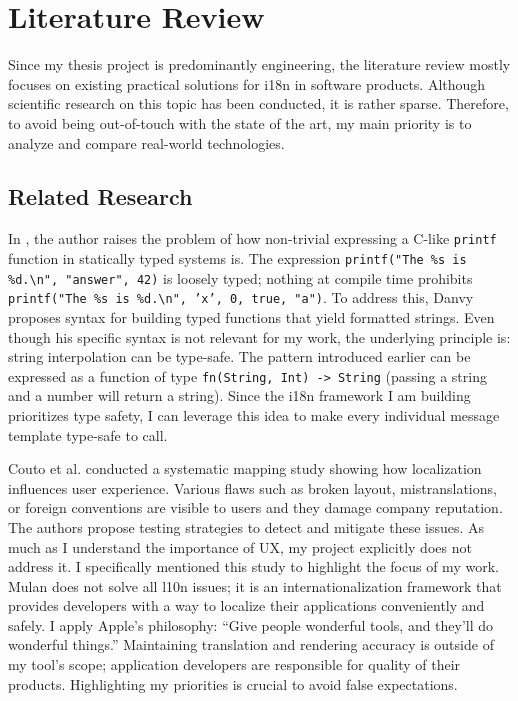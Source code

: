 \chapter{Literature Review}

Since my thesis project is predominantly engineering, the literature
review mostly focuses on existing practical solutions for i18n in
software products. Although scientific research on this topic has
been conducted, it is rather sparse. Therefore, to avoid being
out-of-touch with the state of the art, my main priority is to
analyze and compare real-world technologies.

\section{Related Research}


In \cite{danvy1998}, the author raises the problem of how non-trivial
expressing a C-like \texttt{printf} function in statically typed
systems is. The expression \texttt{printf("The \%s is
\%d.{\textbackslash}n", "answer", 42)} is loosely typed; nothing at
compile time prohibits \texttt{printf("The \%s is
\%d.{\textbackslash}n", 'x', 0, true, "a")}. To address this, Danvy
proposes syntax for building typed functions that yield formatted
strings. Even though his specific syntax is not relevant for my work,
the underlying principle is: string interpolation can be type-safe.
The pattern introduced earlier can be expressed as a function of type
\texttt{fn(String, Int) -> String} (passing a string and a number
will return a string). Since the i18n framework I am building
prioritizes type safety, I can leverage this idea to make every
individual message template type-safe to call.

Couto et al. conducted a systematic mapping study \cite{couto2026}
showing how localization influences user experience. Various flaws
such as broken layout, mistranslations, or foreign conventions are
visible to users and they damage company reputation. The authors
propose testing strategies to detect and mitigate these issues. As
much as I understand the importance of UX, my project explicitly does
not address it. I specifically mentioned this study to highlight the
focus of my work. Mulan does not solve all l10n issues; it is an
internationalization framework that provides developers with a way to
localize their applications conveniently and safely. I apply Apple's
philosophy: \enquote{Give people wonderful tools, and they'll do wonderful
things.} Maintaining translation and rendering accuracy is outside of
my tool's scope; application developers are responsible for quality
of their products. Highlighting my priorities is crucial to avoid
false expectations.

